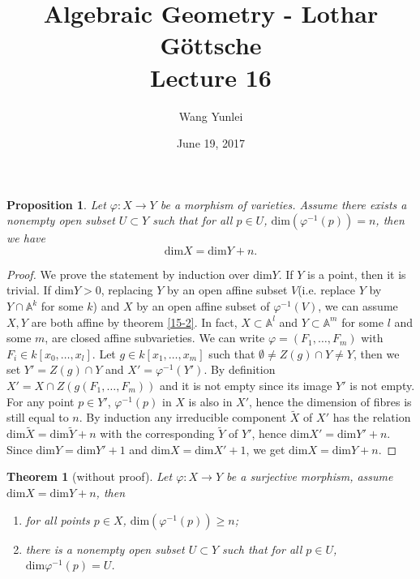 \documentclass{amsart}
\theoremstyle{plain}
\newtheorem{theorem}{Theorem}
\newtheorem{proposition}{Proposition}
\theoremstyle{definition}
\theoremstyle{remark}
\numberwithin{equation}{section}
\begin{document}
\title[Complete-simple distributive lattices]
{Algebraic Geometry - Lothar G\"{o}ttsche \\
	Lecture 16}
\author{Wang Yunlei}
\date{June 19, 2017}
 
\maketitle
\begin{proposition}
	Let $ \varphi:X\to Y $ be a morphism of varieties. Assume there exists a nonempty open subset $ U\subset Y $ such that for all $ p\in U $, $ \text{dim}(\varphi^{-1}(p))=n $, then we have 
	$$
	\text{dim}X=\text{dim}Y+n.
	$$ 
\end{proposition}
\begin{proof}
We prove the statement by induction over $ \text{dim}Y $. If $ Y $ is a point, then it is trivial. If $ \text{dim}Y>0 $, replacing $ Y $ by an open affine subset $ V $(i.e. replace $ Y $ by $ Y\cap \mathbb{A}^k $ for some $ k $) and $ X $ by an open affine subset of $ \varphi^{-1}(V) $, we can assume $ X,Y $ are both affine by theorem \ref{15-2}. In fact, $ X\subset \mathbb{A}^l $ and $ Y\subset \mathbb{A}^m $ for some $ l $ and some $ m $, are closed affine subvarieties. We can write $ \varphi=(F_1,\dots,F_m) $ with $ F_i\in k[x_0,\dots,x_l] $. Let $ g\in k[x_1,\dots,x_m] $ such that $ \emptyset \neq Z(g)\cap Y\neq Y $, then we set $ Y'=Z(g)\cap Y $ and $ X'=\varphi^{-1}(Y') $. By definition $ X'=X\cap Z(g(F_1,\dots,F_m)) $ and it is not empty since its image $ Y' $ is not empty. For any point $ p\in Y' $, $ \varphi^{-1}(p) $ in $ X $ is also in $ X' $, hence the dimension of fibres is still equal to $ n $.  By induction any irreducible component $ \tilde{X} $ of $ X' $ has the relation $ \text{dim}\tilde{X}=\text{dim}\tilde{Y}+n $ with the corresponding $ \tilde{Y} $ of $ Y' $, hence $ \text{dim}X'=\text{dim}Y'+n $. Since $ \text{dim}Y=\text{dim}Y'+1 $ and $ \text{dim}X=\text{dim}X'+1 $, we get $ \text{dim}X=\text{dim}Y+n $.
\end{proof}
\begin{theorem}[without proof]
	Let $ \varphi:X\to Y $ be a surjective morphism, assume $ \text{dim}X=\text{dim}Y+n $, then 
	\begin{enumerate}
		\item for all points $ p\in X $, $ \text{dim}(\varphi^{-1}(p))\geq n $;
		\item there is a nonempty open subset $ U\subset Y $ such that for all $ p\in U $, $ \text{dim}\varphi^{-1}(p)=U $.
	\end{enumerate}
\end{theorem}
\end{document}
